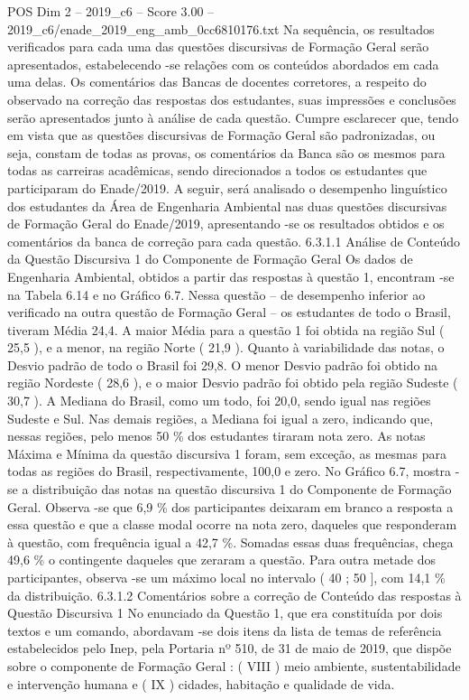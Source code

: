 \begin{textsample}{POS Dim 2 – 2019\_c6 – Score 3.00 – 2019\_c6/enade\_2019\_eng\_amb\_0cc6810176.txt}
Na sequência, os resultados verificados para cada uma das questões discursivas de Formação Geral serão apresentados, estabelecendo -se relações com os conteúdos abordados em cada uma delas.
Os comentários das Bancas de docentes corretores, a respeito do observado na correção das respostas dos estudantes, suas impressões e conclusões serão apresentados junto à análise de cada questão.
Cumpre esclarecer que, tendo em vista que as questões discursivas de Formação Geral são padronizadas, ou seja, constam de todas as provas, os comentários da Banca são os mesmos para todas as carreiras acadêmicas, sendo direcionados a todos os estudantes que participaram do Enade/2019.
A seguir, será analisado o desempenho linguístico dos estudantes da Área de Engenharia Ambiental nas duas questões discursivas de Formação Geral do Enade/2019, apresentando -se os resultados obtidos e os comentários da banca de correção para cada questão. 6.3.1.1 Análise de Conteúdo da Questão Discursiva 1 do Componente de Formação Geral Os dados de Engenharia Ambiental, obtidos a partir das respostas à questão 1, encontram -se na Tabela 6.14 e no Gráfico 6.7.
Nessa questão – de desempenho inferior ao verificado na outra questão de Formação Geral – os estudantes de todo o Brasil, tiveram Média 24,4.
A maior Média para a questão 1 foi obtida na região Sul ( 25,5 ), e a menor, na região Norte ( 21,9 ).
Quanto à variabilidade das notas, o Desvio padrão de todo o Brasil foi 29,8.
O menor Desvio padrão foi obtido na região Nordeste ( 28,6 ), e o maior Desvio padrão foi obtido pela região Sudeste ( 30,7 ).
A Mediana do Brasil, como um todo, foi 20,0, sendo igual nas regiões Sudeste e Sul.
Nas demais regiões, a Mediana foi igual a zero, indicando que, nessas regiões, pelo menos 50 \% dos estudantes tiraram nota zero.
As notas Máxima e Mínima da questão discursiva 1 foram, sem exceção, as mesmas para todas as regiões do Brasil, respectivamente, 100,0 e zero.
No Gráfico 6.7, mostra -se a distribuição das notas na questão discursiva 1 do Componente de Formação Geral.
Observa -se que 6,9 \% dos participantes deixaram em branco a resposta a essa questão e que a classe modal ocorre na nota zero, daqueles que responderam à questão, com frequência igual a 42,7 \%.
Somadas essas duas frequências, chega 49,6 \% o contingente daqueles que zeraram a questão.
Para outra metade dos participantes, observa -se um máximo local no intervalo ( 40 ; 50 ], com 14,1 \% da distribuição. 6.3.1.2 Comentários sobre a correção de Conteúdo das respostas à Questão Discursiva 1 No enunciado da Questão 1, que era constituída por dois textos e um comando, abordavam -se dois itens da lista de temas de referência estabelecidos pelo Inep, pela Portaria nº 510, de 31 de maio de 2019, que dispõe sobre o componente de Formação Geral : ( VIII ) meio ambiente, sustentabilidade e intervenção humana e ( IX ) cidades, habitação e qualidade de vida.

\end{textsample}
